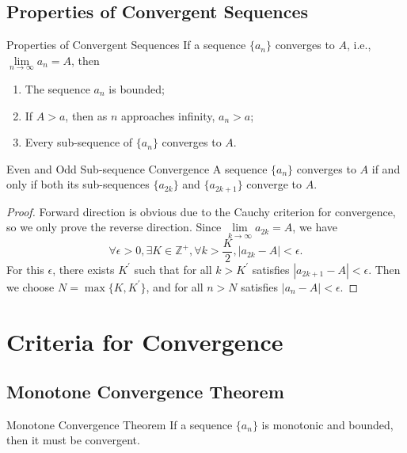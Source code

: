 \subsection{Properties of Convergent Sequences}

\begin{proposition}{Properties of Convergent Sequences}{}
  If a sequence $\{a_n\}$ converges to $A$, i.e.,
  $\lim \limits _{n \rightarrow \infty} a_n = A$, then
  \begin{enumerate}
  \item The sequence $a_n$ is bounded;
  \item If $A > a$, then as $n$ approaches infinity, $a_n > a$;
  \item Every sub-sequence of $\{a_n\}$ converges to $A$.
  \end{enumerate}
\end{proposition}

\begin{theorem}{Even and Odd Sub-sequence Convergence}{}
  A sequence $\{a_n\}$ converges to $A$ if and only if both its sub-sequences
  $\{a_{2k}\}$ and $\{a_{2k+1}\}$ converge to $A$.
\end{theorem}

\begin{proof}
  Forward direction is obvious due to the Cauchy criterion for convergence,
  so we only prove the reverse direction.
  Since $\lim \limits _{k \rightarrow \infty} a_{2k} = A$, we have
  \begin{equation}
    \forall \epsilon > 0, \exists K \in \mathbb{Z}^+, \forall k > \frac{K}{2}, |a_{2k} - A| < \epsilon.
  \end{equation}
  For this $\epsilon$, there exists $K^{\prime}$ such that for all $k >
  K^{\prime}$ satisfies $|a_{2k + 1} - A| < \epsilon$.
  Then we choose $N = \max \{K, K^{\prime}\}$, and for all $n > N$ satisfies
  $|a_n - A| < \epsilon$.
\end{proof}


\section{Criteria for Convergence}

\subsection{Monotone Convergence Theorem}

\begin{theorem}{Monotone Convergence Theorem}{}
  If a sequence $\{a_n\}$ is monotonic and bounded,
  then it must be convergent.
\end{theorem}

